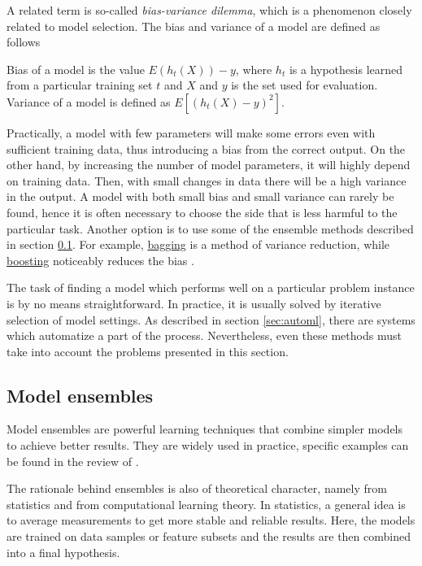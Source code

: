 A related term is so-called \emph{bias-variance dilemma}, which is a phenomenon
closely related to model selection. The bias and variance of a model are
defined as follows \citep[p.59,~356]{CaseBerg:01}

\begin{definition}
Bias of a model is the value $E(h_t(X)) - y$, where $h_t$ is a
hypothesis learned from a particular training set $t$ and $X$ and $y$ is the
set used for evaluation. Variance of a model is defined as $E[(h_t(X) - y)^2]$.
\end{definition}

Practically, a model with few parameters will make some errors even with
sufficient training data, thus introducing a bias from the correct output.
On the other hand, by  increasing the number of model parameters, it will
highly depend on training data. Then, with small changes in data there will be
a high variance in the output. A model with both small bias and small variance
can rarely be found, hence it is often necessary to choose the side that is
less harmful to the particular task. Another option
is to use some of the ensemble methods described in section \ref{ensemble}. For
example, \hyperref[bagging]{bagging} is a method of variance reduction, while
\hyperref[boosting]{boosting} noticeably reduces the bias
\citep[p.~93--94,~338]{Flach:2012:MLA:2490546}.

The task of finding a model which performs well on a particular problem
instance is by no means straightforward. In practice, it is usually solved by
iterative selection of model settings. As described in section \ref{sec:automl},
there are systems which automatize a part of the process. Nevertheless, even
these methods must take into account the problems presented in this section.

\subsection{Model ensembles} \label{ensemble}
Model ensembles are powerful learning techniques that combine simpler models 
to achieve better results. They are widely used in practice, specific examples
can be found in the review of \cite{Rokach:2009:TCE:1609202.1609436}.

The rationale behind ensembles is also of theoretical character, namely from
statistics and from computational learning theory. In statistics, a general
idea is to average measurements to get more stable and reliable results.
Here, the models are trained on data samples or feature subsets and the results
are then combined into a final hypothesis.

